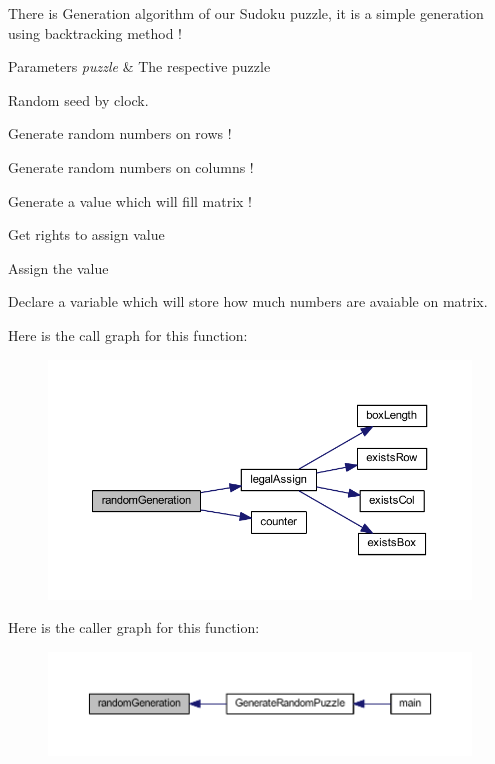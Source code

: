 There is Generation algorithm of our Sudoku puzzle, it is a simple generation using backtracking method ! 


\begin{DoxyParams}{Parameters}
{\em puzzle} & The respective puzzle \\
\hline
\end{DoxyParams}
Random seed by clock.

Generate random numbers on rows !

Generate random numbers on columns !

Generate a value which will fill matrix !

Get rights to assign value

Assign the value

Declare a variable which will store how much numbers are avaiable on matrix. 

Here is the call graph for this function\+:
\nopagebreak
\begin{figure}[H]
\begin{center}
\leavevmode
\includegraphics[width=350pt]{_generate_sudoku_puzzle_8c_a6a49f0a7a0398f2659d6642120ea48dc_cgraph}
\end{center}
\end{figure}




Here is the caller graph for this function\+:
\nopagebreak
\begin{figure}[H]
\begin{center}
\leavevmode
\includegraphics[width=350pt]{_generate_sudoku_puzzle_8c_a6a49f0a7a0398f2659d6642120ea48dc_icgraph}
\end{center}
\end{figure}


